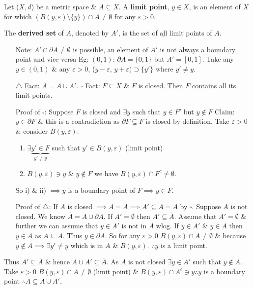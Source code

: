 \documentclass[10pt]{article}
\begin{document}
Let ($X,d$) be a metric space \& $A\subseteq X$. A \textbf{limit point}, $y\in X$, is an element of $X$ for which $(B(y,\varepsilon)\setminus\{y\})\cap A\neq\emptyset$ for any $\varepsilon>0$.

The \textbf{derived set} of $A$, denoted by $A'$, is the set of $\underline{\text{all}}$ limit points of $A$.
\begin{itemize}
    \item[Note:] $A'\cap\partial A\neq\emptyset$ is possible,
    \subitem an element of $A'$ is not always a boundary point and vice-versa
    \subitem Eg: $(0,1)$: $\partial A=\{0,1\}$ but $A'=[0,1]$.
    \subitem Take any $y\in(0,1)$ \& any $\varepsilon>0$, ($y-\varepsilon$, $y+\varepsilon)\supset\{y'\}$ where $y'\neq y$.
    \item[$\triangle$ Fact:] $\overline{A}=A\cup A'$. $\square$ Fact: $F\subseteq X$ \& $F$ is closed. Then $F$ contains all its limit points.
    \item[Proof of $\square$:] Suppose $F$ is closed and $\exists y$ such that $y\in F'$ but $y\notin F$
    \subitem Claim: $y\in\partial F$ \& this is a contradiction as $\partial F\subseteq F$ is closed by definition.
    \subitem Take $\varepsilon>0$ \& consider $B(y,\varepsilon)$:
    \begin{enumerate}[label=\roman*)]
        \item $\exists \underbrace{y'\in F}_{y'\neq y}$ such that $y'\in B(y,\varepsilon)$ (limit point)
        \item $B(y,\varepsilon)\ni y$ \& $y\notin F$ we have $B(y,\varepsilon)\cap F^{c}\neq\emptyset$.
    \end{enumerate}
    So i) \& ii) $\implies y$ is a boundary point of $F\implies y\in F$.
    \item[Proof of $\triangle$:] If $A$ is closed $\implies A=\overline{A}\implies A'\subseteq A=\overline{A}$ by $\square$.
    \subitem Suppose $A$ is not closed. We know $\overline{A}=A\cup\partial A$. If $A'=\emptyset$ then $A'\subseteq\overline{A}$.
    \subitem Assume that $A'=\emptyset$ \& further we can assume that $y\in A'$ is not in $A$ wlog. 
    \subitem If $y\in A'$ \& $y\in A$ then $y\in\overline{A}$ as $A\subseteq\overline{A}$. Thus $y\in\partial A$.
    \subitem So for any $\varepsilon>0$ $B(y,\varepsilon)\cap A\neq\emptyset$ \& because $y\notin A\implies\exists y'\neq y$ which is in $A$ \& $B(y,\varepsilon)$.
    \subitem $\therefore y$ is a limit point.
\end{itemize}
Thus $A'\subseteq\overline{A}$ \& hence $A\cup A'\subseteq\overline{A}$. As $A$ is not closed $\exists y\in A'$ such that $y\notin A$. \hspace*{\fill}\\
Take $\varepsilon>0$ $B(y,\varepsilon)\cap A\neq\emptyset$ (limit point) \& $B(y, \varepsilon)\cap A^{c}\ni y\therefore y$ is a boundary point $\therefore\overline{A}\subseteq A\cup A'$.
\end{document}

